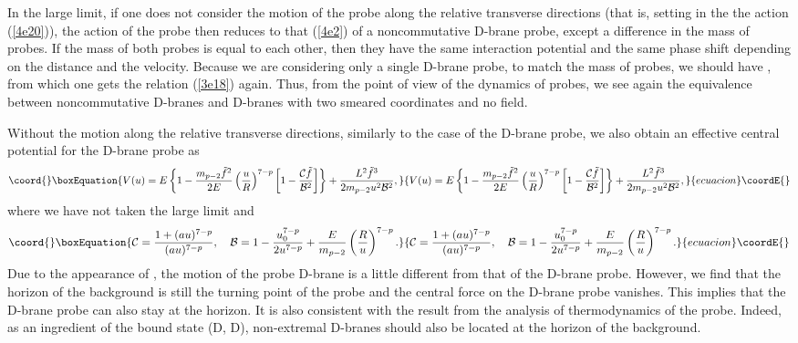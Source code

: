 \documentclass[a4paper,12pt]{article}
\begin{document}
In the large \coordHE{} limit, if one does not consider the motion of the
probe along the relative transverse directions (that is, setting
\coordHE{} in the the action (\ref{4e20})),
the action of the probe then reduces to that (\ref{4e2}) of
a noncommutative D\coordHE{}-brane probe, except a difference in the mass of probes.
If the mass of both probes is equal to each other, then they have the same
interaction potential and the same phase shift depending on the distance
and the velocity. Because we are considering only a single D-brane probe,
to match the mass of probes, we should have \coordHE{}, from which one gets the relation (\ref{3e18}) again. Thus, from
the point of view of the dynamics of probes, we see again the equivalence
between \coordHE{} noncommutative D\coordHE{}-branes and \coordHE{}
D\coordHE{}-branes with two smeared coordinates and no \coordHE{} field.

Without the motion along the relative transverse directions,
similarly to the case of the D\coordHE{}-brane probe, we also obtain an effective
central potential for the D\coordHE{}-brane probe as
\begin{equation}\coord{}\boxEquation{
\label{dp2pot}
V(u)= E\left \{ 1-\frac{m_{p-2}\tilde{f}^2}{2E}
 \left(\frac{u}{R}\right)^{7-p}\left [1-\frac{{\cal C} \tilde{f}}
 {{\cal B}^2}\right] \right\}
 +\frac{L^2 \tilde{f}^3}{2m_{p-2}u^2 {\cal B}^2},
}{
V(u)= E\left \{ 1-\frac{m_{p-2}\tilde{f}^2}{2E}
 \left(\frac{u}{R}\right)^{7-p}\left [1-\frac{{\cal C} \tilde{f}}
 {{\cal B}^2}\right] \right\}
 +\frac{L^2 \tilde{f}^3}{2m_{p-2}u^2 {\cal B}^2},
}{ecuacion}\coordE{}\end{equation}
where we have not taken the large \coordHE{} limit and
\begin{equation}\coord{}\boxEquation{
{\cal C}=\frac{1+(au)^{7-p}}{(au)^{7-p}}, \ \ \
{\cal B}=1-\frac{u_0^{7-p}}{2u^{7-p}}
 +\frac{E}{m_{p-2}}\left(\frac{R}{u}\right)^{7-p}.
}{
{\cal C}=\frac{1+(au)^{7-p}}{(au)^{7-p}}, \ \ \
{\cal B}=1-\frac{u_0^{7-p}}{2u^{7-p}}
 +\frac{E}{m_{p-2}}\left(\frac{R}{u}\right)^{7-p}.
}{ecuacion}\coordE{}\end{equation}
Due to the appearance of \myHighlight{${\cal C}$}\coordHE{}, the motion of the probe D\coordHE{}-brane
is a little different from that of the D\coordHE{}-brane probe. However, we find
that the horizon of the background is still the turning point of the probe
and the central force on the D\myHighlight{$(p-2)$}\coordHE{}-brane probe vanishes. This implies that
the D\coordHE{}-brane probe can also stay at the horizon. It is also consistent
with the result from the analysis of thermodynamics of the probe. Indeed, as
an ingredient of the bound state (D\myHighlight{$(p-2)$}\coordHE{}, D\myHighlight{$p$}\coordHE{}), non-extremal
D\myHighlight{$(p-2)$}\coordHE{}-branes should also be located at the horizon of the background.
\end{document}
